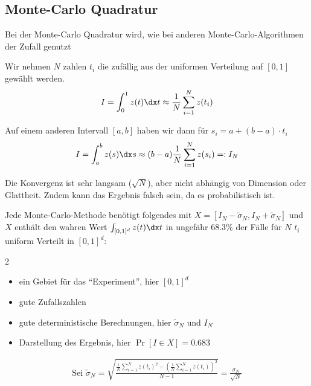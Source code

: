 
\newsection
\newcommand{\tsigma}{\tilde{\sigma}}
\subsection{Monte-Carlo Quadratur}
Bei der Monte-Carlo Quadratur wird, wie bei anderen Monte-Carlo-Algorithmen der Zufall genutzt

 Wir nehmen $N$ zahlen $t_i$ die zufällig aus der uniformen Verteilung auf $[0, 1]$ gewählt werden.
\rmvspace
\begin{align*}
    I = \int_{0}^{1} z(t) \dx t \approx \frac{1}{N} \sum_{i = 1}^{N} z(t_i)
\end{align*}

\drmvspace Auf einem anderen Intervall $[a, b]$ haben wir dann für $s_i = a + (b - a) \cdot t_i$
\rmvspace
\begin{align*}
    I = \int_{a}^{b} z(s) \dx s \approx (b - a) \frac{1}{N} \sum_{i = 1}^{N} z(s_i) =: I_N
\end{align*}

\inlineremark Die Konvergenz ist sehr langsam ($\sqrt{N}$), aber nicht abhängig von Dimension oder Glattheit.
Zudem kann das Ergebnis falsch sein, da es probabilistisch ist.

Jede Monte-Carlo-Methode benötigt folgendes mit $X = [I_N - \tsigma_N, I_N + \tsigma_N]$ und $X$ enthält den wahren Wert $\int_{[0, 1]^d} z(t) \dx t$ in ungefähr $68.3\%$ der Fälle
für $N$ $t_i$ uniform Verteilt in $[0, 1]^d$:
\rmvspace
\begin{multicols}{2}
    \begin{itemize}[noitemsep]
        \item ein Gebiet für das ``Experiment'', hier $[0, 1]^d$
        \item gute Zufallszahlen
        \item gute deterministische Berechnungen, hier $\tsigma_N$ und $I_N$
        \item Darstellung des Ergebnis, hier $\Pr[I \in X] = 0.683$
    \end{itemize}
\end{multicols}

\drmvspace\drmvspace
\begin{align*}
    \text{Sei }\tsigma_N = \sqrt{\frac{\frac{1}{N} \sum_{i = 1}^{N} z(t_i)^2 - \left( \frac{1}{N} \sum_{i = 1}^{N} z(t_i) \right)^2}{N - 1}} = \frac{\sigma_N}{\sqrt{N}}
\end{align*}


